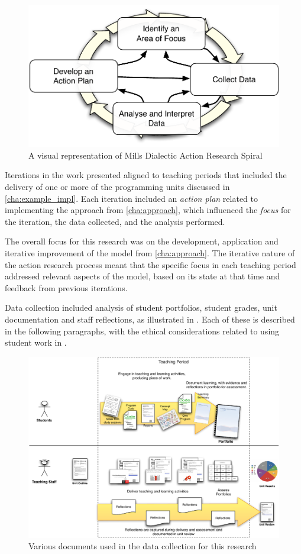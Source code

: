 \begin{figure}[htbp]
  \centering
  \includegraphics[width=0.7\columnwidth]{MillsSpiral}
  \caption{A visual representation of Mills \cite{Mills:2010} Dialectic Action Research Spiral}
  \label{fig:mills_spiral}
\end{figure}

Iterations in the work presented aligned to teaching periods that included the delivery of one or more of the programming units discussed in \cref{cha:example_impl}. Each iteration included an \emph{action plan} related to implementing the approach from \cref{cha:approach}, which influenced the \emph{focus} for the iteration, the data collected, and the analysis performed.

The overall focus for this research was on the development, application and iterative improvement of the model from \cref{cha:approach}. The iterative nature of the action research process meant that the specific focus in each teaching period addressed relevant aspects of the model, based on its state at that time and feedback from previous iterations. 

Data collection included analysis of student portfolios, student grades, unit documentation and staff reflections, as illustrated in . Each of these is described in the following paragraphs, with the ethical considerations related to using student work in .

\begin{figure}[thb]
  \centering
  \includegraphics[width=\textwidth]{ResearchData}
  \caption{Various documents used in the data collection for this research}
  \label{fig:research_data}
\end{figure}


